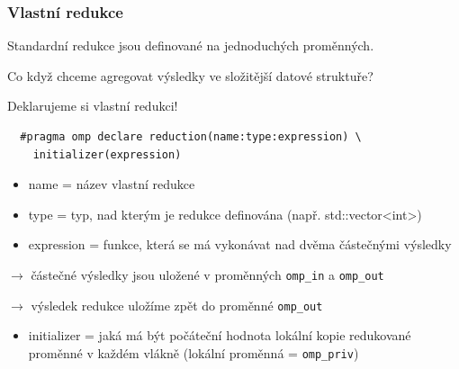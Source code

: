 \documentclass[usenames,dvipsnames,9pt]{beamer}
\begin{document}
\begin{frame}[fragile]
  \frametitle{Vlastní redukce}
  
  Standardní redukce jsou definované na jednoduchých proměnných.
  
  \begin{center}
  \Large Co když chceme agregovat výsledky ve složitější datové struktuře?
  \end{center}
  
  \pause
  
  \hfill Deklarujeme si vlastní redukci!
  
  \pause
  
  \begin{verbatim}
  #pragma omp declare reduction(name:type:expression) \ 
  	initializer(expression)
 \end{verbatim}
 \pause
 \begin{itemize}
 \item name = název vlastní redukce
 \item type = typ, nad kterým je redukce definována (např. std::vector<int>)
 \item expression = funkce, která se má vykonávat nad dvěma částečnými výsledky 
 \end{itemize}
 \pause
 $\rightarrow$ částečné výsledky jsou uložené v proměnných \texttt{omp\_in} a \texttt{omp\_out}
 
  $\rightarrow$ výsledek redukce uložíme zpět do proměnné \texttt{omp\_out}
 \pause
  \begin{itemize}
 \item initializer = jaká má být počáteční hodnota lokální kopie redukované proměnné v každém vlákně
       (lokální proměnná = \texttt{omp\_priv})
 \end{itemize} 

\end{frame}
\end{document}
